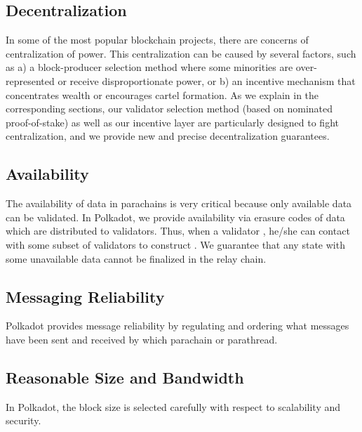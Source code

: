 \subsection{Decentralization}

In some of the most popular blockchain projects, there are concerns of centralization of power.
This centralization can be caused by several factors, such as
a) a block-producer selection method where some minorities are over-represented or receive disproportionate power, or
b) an incentive mechanism that concentrates wealth or encourages cartel formation.
As we explain in the corresponding sections, our validator selection method (based on nominated proof-of-stake)
as well as our incentive layer are particularly designed to fight centralization,
and we provide new and precise decentralization guarantees.


 \subsection{Availability}
The availability of data in parachains is very critical because only available data can be validated.  In Polkadot, we provide availability via erasure codes of data which are distributed to validators. Thus, when a validator , he/she can contact with some subset of validators to construct . We guarantee that any state with some unavailable data cannot be finalized in the relay chain.



\subsection{Messaging Reliability} Polkadot provides message reliability by regulating and ordering what messages have been sent and received by which parachain or parathread.

\subsection{Reasonable Size and Bandwidth} In Polkadot, the block size is selected carefully with respect to scalability and security. 


